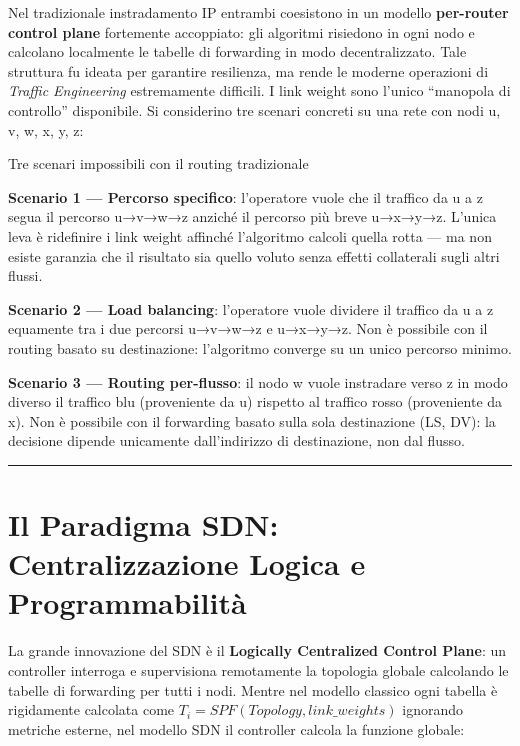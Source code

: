 \documentclass[
  italian,
  openany]{book}
\begin{document}
Nel tradizionale instradamento IP entrambi coesistono in un modello
\textbf{per-router control plane} fortemente accoppiato: gli algoritmi
risiedono in ogni nodo e calcolano localmente le tabelle di forwarding
in modo decentralizzato. Tale struttura fu ideata per garantire
resilienza, ma rende le moderne operazioni di \emph{Traffic Engineering}
estremamente difficili. I link weight sono l'unico ``manopola di
controllo'' disponibile. Si considerino tre scenari concreti su una rete
con nodi u, v, w, x, y, z:

\begin{callouttip}{Tre scenari impossibili con il routing tradizionale}

\textbf{Scenario 1 --- Percorso specifico}: l'operatore vuole che il
traffico da u a z segua il percorso u→v→w→z anziché il percorso più
breve u→x→y→z. L'unica leva è ridefinire i link weight affinché
l'algoritmo calcoli quella rotta --- ma non esiste garanzia che il
risultato sia quello voluto senza effetti collaterali sugli altri
flussi.

\textbf{Scenario 2 --- Load balancing}: l'operatore vuole dividere il
traffico da u a z equamente tra i due percorsi u→v→w→z e u→x→y→z. Non è
possibile con il routing basato su destinazione: l'algoritmo converge su
un unico percorso minimo.

\textbf{Scenario 3 --- Routing per-flusso}: il nodo w vuole instradare
verso z in modo diverso il traffico blu (proveniente da u) rispetto al
traffico rosso (proveniente da x). Non è possibile con il forwarding
basato sulla sola destinazione (LS, DV): la decisione dipende unicamente
dall'indirizzo di destinazione, non dal flusso.

\end{callouttip}

\begin{center}\rule{0.5\linewidth}{0.5pt}\end{center}

\section{Il Paradigma SDN: Centralizzazione Logica e
Programmabilità}\label{il-paradigma-sdn-centralizzazione-logica-e-programmabilituxe0}

La grande innovazione del SDN è il \textbf{Logically Centralized Control
Plane}: un controller interroga e supervisiona remotamente la topologia
globale calcolando le tabelle di forwarding per tutti i nodi. Mentre nel
modello classico ogni tabella è rigidamente calcolata come
\(T_{i} = SPF(Topology, link\_weights)\) ignorando metriche esterne, nel
modello SDN il controller calcola la funzione globale:
\end{document}
